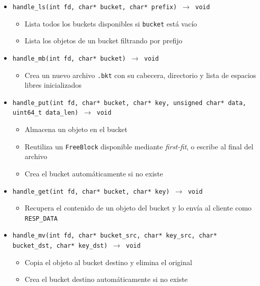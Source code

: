 \documentclass[12pt, letterpaper]{article}
\begin{document}
\begin{itemize}
    \subsection*{Manejadores de comandos}
    \item \texttt{handle\_ls(int fd, char* bucket, char* prefix) $\to$ void}
        \begin{itemize}
            \item Lista todos los buckets disponibles si \texttt{bucket} 
                  está vacío
            \item Lista los objetos de un bucket filtrando por prefijo
        \end{itemize}
    \item \texttt{handle\_mb(int fd, char* bucket) $\to$ void}
        \begin{itemize}
            \item Crea un nuevo archivo \texttt{.bkt} con su cabecera, 
                  directorio y lista de espacios libres inicializados
        \end{itemize}
    \item \texttt{handle\_put(int fd, char* bucket, char* key, 
          unsigned char* data, uint64\_t data\_len) $\to$ void}
        \begin{itemize}
            \item Almacena un objeto en el bucket
            \item Reutiliza un \texttt{FreeBlock} disponible mediante 
                  \textit{first-fit}, o escribe al final del archivo
            \item Crea el bucket automáticamente si no existe
        \end{itemize}
    \item \texttt{handle\_get(int fd, char* bucket, char* key) $\to$ void}
        \begin{itemize}
            \item Recupera el contenido de un objeto del bucket y lo 
                  envía al cliente como \texttt{RESP\_DATA}
        \end{itemize}
    \item \texttt{handle\_mv(int fd, char* bucket\_src, char* key\_src, 
          char* bucket\_dst, char* key\_dst) $\to$ void}
        \begin{itemize}
            \item Copia el objeto al bucket destino y elimina el original
            \item Crea el bucket destino automáticamente si no existe

\end{itemize}
\end{itemize}
\end{document}
